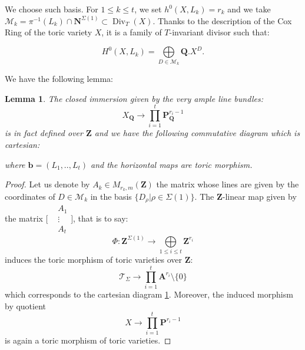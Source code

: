 \documentclass{proc-l}
\newcommand{\Z}{\mathbf{Z}}
\newcommand{\Proj}{\mathbf{P}}
\newcommand{\N}{\mathbf{N}}
\newcommand{\Q}{\mathbf{Q}}
\newcommand{\base}{\mathbf{b}}
\DeclareMathOperator{\Div}{Div}
\newcommand{\stackT}{\mathcal{T}}
\newcommand{\affine}{\mathbf{A}}
\newtheorem{lemma}[theorem]{Lemma}
\theoremstyle{definition}
\theoremstyle{remark}
\numberwithin{equation}{section}
\begin{document}
We choose such basis. For $1 \leqslant k \leqslant t$, we set $h^0(X,L_k) = r_k$ and we take $\mathcal{M}_k  = \pi^{-1}(L_k) \cap \N^{\Sigma(1)} \subset \Div_T(X)$. Thanks to the description of the Cox Ring of the toric variety $X$, it is a family of $T$-invariant divisor such that:

\begin{equation}\label{base_section_globale}
H^0(X,L_k) = \bigoplus\limits_{D \in \mathcal{M}_k} \Q. X^D .
\end{equation}

We have the following lemma:

\begin{lemma}\label{catesian_diagram_very_ample_basis}
    The closed immersion given by the very ample line bundles:
    $$X_{\Q} \rightarrow \prod\limits_{i = 1}^t \Proj^{r_i-1}_{\Q}    $$is in fact defined over $\Z$ and we have the following commutative diagram which is cartesian:
    \begin{center}
    \end{center}where $\base = (L_1,..,L_t)$ and the horizontal maps are toric morphism.   
\end{lemma}

\begin{proof}
    Let us denote by $A_k \in M_{r_k,m}(\Z) $ the matrix whose lines are given by the coordinates of $D \in \mathcal{M}_k$ in the basis $\{ D_{\rho} | \rho \in \Sigma(1) \}$. The $\Z$-linear map given by the matrix $\Bigg[\begin{smallmatrix}
&A_1\\
&\vdots \\
&A_t
\end{smallmatrix}\Bigg]$, that is to say:
   $$ \Phi : \Z^{\Sigma(1)}\rightarrow \bigoplus\limits_{1 \leqslant i \leqslant t} \Z^{r_i}$$
  induces the toric morphism of toric varieties over $\Z$:
   $$ \mathcal{T}_{\Sigma} \rightarrow \prod\limits_{i = 1}^t \affine^{r_i} \setminus \{ 0 \}$$
   which corresponds to the cartesian diagram \ref{catesian_diagram_very_ample_basis}. Moreover, the induced morphism by quotient $$ X \rightarrow \prod\limits_{i = 1}^t \Proj^{r_i-1}$$is again a toric morphism of toric varieties.
\end{proof}
\end{document}
